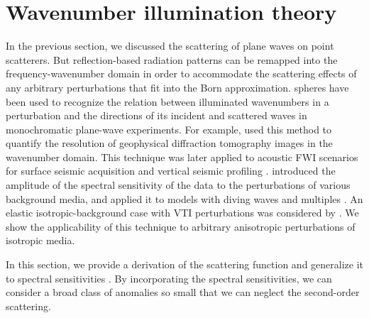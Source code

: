 \section{Wavenumber illumination theory}
In the previous section, we discussed the scattering of plane waves on point 
scatterers. But reflection-based radiation patterns can be 
remapped into the frequency-wavenumber domain in order to accommodate the scattering effects of any arbitrary perturbations that fit into the Born approximation.
%
\cite{ewald1969} spheres have been used to recognize the relation between illuminated wavenumbers in a perturbation and the directions of its incident and scattered waves in monochromatic plane-wave experiments. 
For example, \cite{devaney1984} used this 
method to quantify the resolution of geophysical diffraction tomography images in the
wavenumber domain. This technique was later applied to acoustic FWI scenarios 
for surface seismic acquisition \citep{mora1989} and vertical seismic profiling 
\citep{wu:11}. \cite{kazei2013gp} introduced the amplitude of the spectral 
sensitivity of the data to the perturbations of various background media, and applied it to models with diving waves and multiples \citep{kazei2015seg,kazei2013spectral}. An elastic isotropic-background case 
with VTI perturbations was considered by \cite{podgornova}. We show the 
applicability of this technique to arbitrary anisotropic perturbations of isotropic media. 
%
% 


In this section, we provide a derivation of the 
scattering function and 
generalize it to spectral sensitivities 
\citep{kazei2013gp,podgornova,kazei2017}.
%
By incorporating the spectral sensitivities, we can consider a broad class of anomalies 
so small that we can neglect the second-order scattering. 
%
 

% 

%
%
%

%


